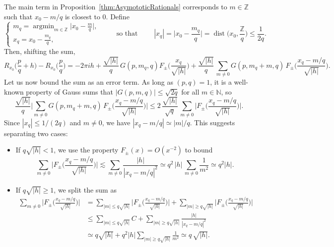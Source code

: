 \documentclass[11pt,reqno]{amsart}
\theoremstyle{definition}
\begin{document}
The main term in Proposition~\ref{thm:AsymototicRationals}
corresponds to $m \in \mathbb Z$ such that $x_0 - m/q$ is closest to 0. 
Define
\begin{equation}\label{eq:x_q_AND_m_q}
\left\{
\begin{array}{l}
m_q = \operatorname{argmin}_{m \in \mathbb Z} \big |x_0 - \frac{m}{q} \big|, \\
x_q = x_0 - \frac{m_q}{q},
\end{array}
\right.
\qquad \text{ so that } \qquad 
|x_q| 
= \Big| x_0 - \frac{m_q}{q} \Big| 
= \operatorname{dist} \Big( x_0, \frac{\mathbb Z}{q} \Big) 
\leq \frac{1}{2q}.
\end{equation}
Then, shifting the sum, 
\begin{equation}
R_{x_0}\Big( \frac{p}{q} + h  \Big)  - R_{x_0}\Big( \frac{p}{q} \Big)  =   - 2\pi i h + \frac{\sqrt{|h|}}{q} \,  G(p,m_q,q) F_\pm\Big( \frac{x_q}{\sqrt{|h|}} \Big)  
 + \frac{\sqrt{|h|}}{q} \, \sum_{m \neq 0} G(p,m_q + m, q) \, F_\pm \Big( \frac{x_q - m/q}{\sqrt{|h|}} \Big). 
\end{equation}
Let us now bound the sum as an error term. 
As long as $(p,q) = 1$, it is a well-known property of Gauss sums that $|G(p,m,q)| \leq \sqrt{2q}$ for all $m \in \mathbb N$, so 
\begin{equation}
\frac{\sqrt{|h|}}{q} \Big|  \sum_{m \neq 0} G(p,m_q + m, q) \, F_\pm \Big( \frac{x_q - m/q}{\sqrt{|h|}} \Big)  \Big|
 \leq 
 2\, \frac{\sqrt{|h|}}{\sqrt{q}} \, \sum_{m \neq 0} \Big|  F_\pm \Big( \frac{x_q - m/q}{\sqrt{|h|}} \Big) \Big|. 
\end{equation}
Since $|x_q| \leq 1/(2q)$ and $m \neq 0$, we have $|x_q - m/q| \simeq |m|/q$.
This suggests separating two cases:
\begin{itemize}
	\item If $q \sqrt{|h|} < 1$, we use the property $F_\pm(x) = O(x^{-2})$ to bound
\begin{equation}
\sum_{m \neq 0} \Big|  F_\pm\Big( \frac{x_q - m/q}{\sqrt{|h|}} \Big) \Big| 
 \lesssim   \sum_{m \neq 0} \frac{|h|}{|x_q - m/q|^2}
 \simeq q^2 \, |h|\, \sum_{m \neq 0} \frac{1}{m^2}
 \simeq  q^2 |h|. 
\end{equation}	

\item If $q \sqrt{|h|} \geq 1$, we split the sum as 
	\begin{equation}
\begin{split}
\sum_{m \neq 0} \Big|  F_\pm \Big( \frac{x_q - m/q}{\sqrt{|h|}} \Big) \Big| 
& = \sum_{|m| \leq q\sqrt{|h|}} \Big|  F_\pm \Big( \frac{x_q - m/q}{\sqrt{|h|}} \Big) \Big| + \sum_{|m| \geq q\sqrt{|h|}} \Big|  F_\pm \Big( \frac{x_q - m/q}{\sqrt{|h|}} \Big) \Big| \\
& \leq \sum_{|m| \leq q\sqrt{|h|}} C + \sum_{|m| \geq q\sqrt{|h|}} \frac{|h|}{|x_q - m/q|^2} \\
& \simeq q \sqrt{|h|} + q^2 |h| \sum_{|m| \geq q\sqrt{|h|}} \frac{1}{m^2}  \simeq  q \, \sqrt{|h|}. 
\end{split}
\end{equation}
\end{itemize} 
\end{document}
